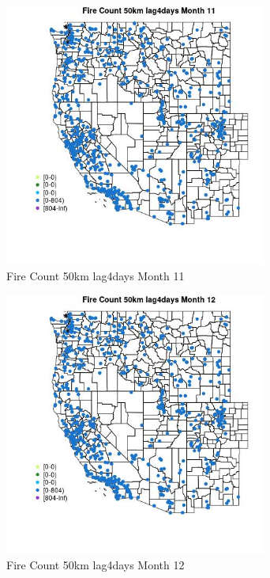 \begin{figure} 
\centering  
\includegraphics[width=0.77\textwidth]{Code_Outputs/Report_ML_input_PM25_Step4_part_f_de_duplicated_aveswNAs_MapObsMo11Fire_Count_50km_lag4days.jpg} 
\caption{\label{fig:Report_ML_input_PM25_Step4_part_f_de_duplicated_aveswNAsMapObsMo11Fire_Count_50km_lag4days}Fire Count 50km lag4days Month 11} 
\end{figure} 
 

\begin{figure} 
\centering  
\includegraphics[width=0.77\textwidth]{Code_Outputs/Report_ML_input_PM25_Step4_part_f_de_duplicated_aveswNAs_MapObsMo12Fire_Count_50km_lag4days.jpg} 
\caption{\label{fig:Report_ML_input_PM25_Step4_part_f_de_duplicated_aveswNAsMapObsMo12Fire_Count_50km_lag4days}Fire Count 50km lag4days Month 12} 
\end{figure} 
 

